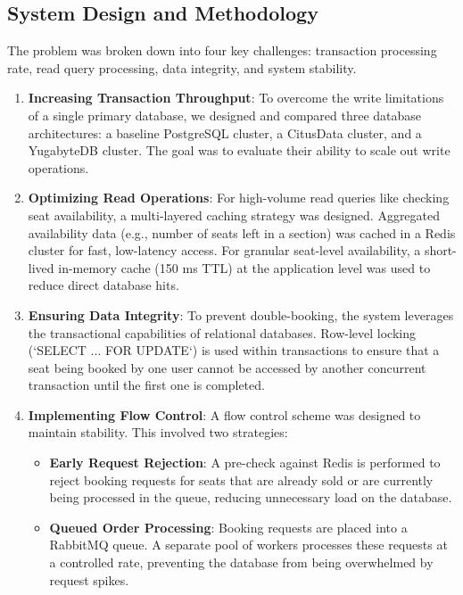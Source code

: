 \subsection{System Design and Methodology}
The problem was broken down into four key challenges: transaction processing rate, read query processing, data integrity, and system stability.

\begin{enumerate}
    \item \textbf{Increasing Transaction Throughput}: To overcome the write limitations of a single primary database, we designed and compared three database architectures: a baseline PostgreSQL cluster, a CitusData cluster, and a YugabyteDB cluster. The goal was to evaluate their ability to scale out write operations.

    \item \textbf{Optimizing Read Operations}: For high-volume read queries like checking seat availability, a multi-layered caching strategy was designed. Aggregated availability data (e.g., number of seats left in a section) was cached in a Redis cluster for fast, low-latency access. For granular seat-level availability, a short-lived in-memory cache (150 ms TTL) at the application level was used to reduce direct database hits.

    \item \textbf{Ensuring Data Integrity}: To prevent double-booking, the system leverages the transactional capabilities of relational databases. Row-level locking (`SELECT ... FOR UPDATE`) is used within transactions to ensure that a seat being booked by one user cannot be accessed by another concurrent transaction until the first one is completed.

    \item \textbf{Implementing Flow Control}: A flow control scheme was designed to maintain stability. This involved two strategies:
          \begin{itemize}
              \item \textbf{Early Request Rejection}: A pre-check against Redis is performed to reject booking requests for seats that are already sold or are currently being processed in the queue, reducing unnecessary load on the database.
              \item \textbf{Queued Order Processing}: Booking requests are placed into a RabbitMQ queue. A separate pool of workers processes these requests at a controlled rate, preventing the database from being overwhelmed by request spikes.
          \end{itemize}
\end{enumerate}

